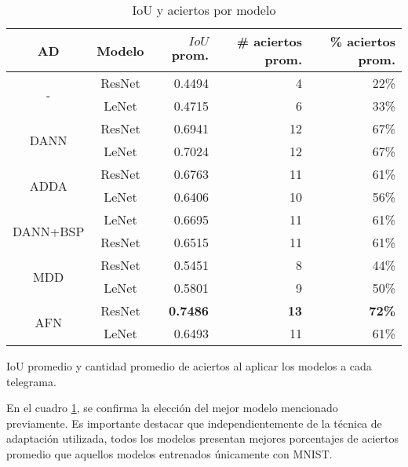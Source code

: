\begin{table}[H]
    \centering
    \begin{tabular}{cc|rrr}
        \toprule
        AD                           & Modelo & $IoU$ prom.     & \# aciertos prom. & \% aciertos prom. \\
        \midrule
        \multirow[c]{2}{*}{-}        & ResNet & 0.4494          & 4                 & 22\%              \\
                                     & LeNet  & 0.4715          & 6                 & 33\%              \\\hline
        \multirow[c]{2}{*}{DANN}     & ResNet & 0.6941          & 12                & 67\%              \\
                                     & LeNet  & 0.7024          & 12                & 67\%              \\\hline
        \multirow[c]{2}{*}{ADDA}     & ResNet & 0.6763          & 11                & 61\%              \\
                                     & LeNet  & 0.6406          & 10                & 56\%              \\\hline
        \multirow[c]{2}{*}{DANN+BSP} & LeNet  & 0.6695          & 11                & 61\%              \\
                                     & ResNet & 0.6515          & 11                & 61\%              \\\hline
        \multirow[c]{2}{*}{MDD}      & ResNet & 0.5451          & 8                 & 44\%              \\
                                     & LeNet  & 0.5801          & 9                 & 50\%              \\\hline
        \multirow[c]{2}{*}{AFN}      & ResNet & \textbf{0.7486} & \textbf{13}       & \textbf{72\%}     \\
                                     & LeNet  & 0.6493          & 11                & 61\%              \\
        \bottomrule
    \end{tabular}
    \caption{IoU y aciertos por modelo}{IoU promedio y cantidad promedio de aciertos al aplicar los modelos a cada telegrama.}
    \label{tab:iou-cant-aciertos-en-telegramas}
\end{table}

En el cuadro \ref{tab:iou-cant-aciertos-en-telegramas}, se confirma la elección del mejor modelo mencionado
previamente. Es importante destacar que independientemente de la técnica de adaptación utilizada, todos los modelos
presentan mejores porcentajes de aciertos promedio que aquellos modelos entrenados únicamente con MNIST.

